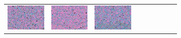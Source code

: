 \documentclass{ipol}
\begin{document}
\begin{figure}[ht]
\begin{subfigure}[t]{\linewidth}
\begin{tabular}{ccccccccc}
                \includegraphics[width=\s]{images/flowers/AHD/iso_n5_64_grids.png}&
                \includegraphics[width=\s]{images/flowers/DCB/iso_n5_64_grids.png}&
                \includegraphics[width=\s]{images/flowers/DHT/iso_n5_64_grids.png}&

\end{tabular}
\end{subfigure}
\end{figure}
\end{document}

